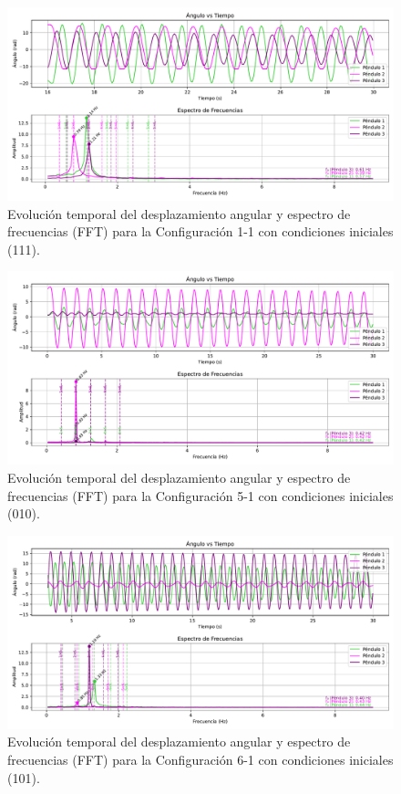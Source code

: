 \begin{figure}[htbp!]
	\centering
	\includegraphics[width=\linewidth]{./Figures/111_11_filtrado.pdf}
	\caption{Evoluci\'on temporal del desplazamiento angular y espectro de
		frecuencias (FFT) para la Configuraci\'on 1-1 con condiciones
	iniciales (111).}
	\label{fig:111-11}
\end{figure}

\begin{figure}[htbp!]
	\centering
	\includegraphics[width=\linewidth]{./Figures/010_15_filtrado.pdf}
	\caption{Evoluci\'on temporal del desplazamiento angular y espectro de
		frecuencias (FFT) para la Configuraci\'on 5-1 con condiciones
	iniciales (010).}
	\label{fig:010-51}
\end{figure}

\begin{figure}[htbp!]
	\centering
	\includegraphics[width=\linewidth]{./Figures/101_16_filtrado.pdf}
	\caption{Evoluci\'on temporal del desplazamiento angular y espectro de
		frecuencias (FFT) para la Configuraci\'on 6-1 con condiciones
	iniciales (101).}
	\label{fig:101-61}
\end{figure}

